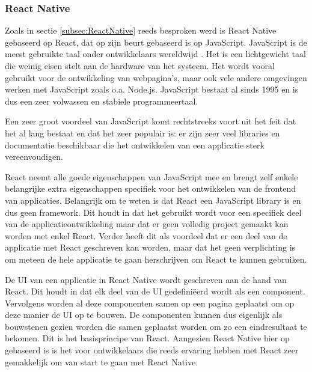 \subsubsection{React Native}
\label{subsubsec:taalReactNative}

Zoals in sectie \ref{subsec:ReactNative} reeds besproken werd is React Native gebaseerd op React, dat op zijn beurt gebaseerd is op JavaScript. JavaScript is de meest gebruikte taal onder ontwikkelaars wereldwijd \autocite{Liu2020a}. Het is een lichtgewicht taal die weinig eisen stelt aan de hardware van het systeem. Het wordt vooral gebruikt voor de ontwikkeling van webpagina's, maar ook vele andere omgevingen werken met JavaScript zoals o.a. Node.js. JavaScript bestaat al sinds 1995 en is dus een zeer volwassen en stabiele programmeertaal.

Een zeer groot voordeel van JavaScript komt rechtstreeks voort uit het feit dat het al lang bestaat en dat het zeer populair is: er zijn zeer veel libraries en documentatie beschikbaar die het ontwikkelen van een applicatie sterk vereenvoudigen.

React neemt alle goede eigenschappen van JavaScript mee en brengt zelf enkele belangrijke extra eigenschappen specifiek voor het ontwikkelen van de frontend van applicaties. Belangrijk om te weten is dat React een JavaScript library is en dus geen framework. Dit houdt in dat het gebruikt wordt voor een specifiek deel van de applicatieontwikkeling maar dat er geen volledig project gemaakt kan worden met enkel React. Verder heeft dit als voordeel dat er een deel van de applicatie met React geschreven kan worden, maar dat het geen verplichting is om meteen de hele applicatie te gaan herschrijven om React te kunnen gebruiken.

De UI van een applicatie in React Native wordt geschreven aan de hand van React. Dit houdt in dat elk deel van de UI gedefiniëerd wordt als een component. Vervolgens worden al deze componenten samen op een pagina geplaatst om op deze manier de UI op te bouwen. De componenten kunnen dus eigenlijk als bouwstenen gezien worden die samen geplaatst worden om zo een eindresultaat te bekomen. Dit is het basisprincipe van React. Aangezien React Native hier op gebaseerd is is het voor ontwikkelaars die reeds ervaring hebben met React zeer gemakkelijk om van start te gaan met React Native.

